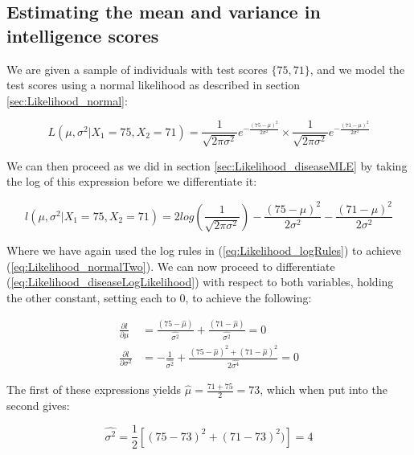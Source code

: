 \documentclass[11pt,fullpage]{book}
\begin{document}
\subsection{Estimating the mean and variance in intelligence scores}
We are given a sample of individuals with test scores $\{75,71\}$, and we model the test scores using a normal likelihood as described in section \ref{sec:Likelihood_normal}:

\begin{equation}\label{eq:Likelihood_normalTwo}
L(\mu,\sigma^2|X_1=75,X_2 =71) = \frac{1}{\sqrt{2\pi\sigma^2}}e^{-\frac{(75-\mu)^2}{2\sigma^2}}\times \frac{1}{\sqrt{2\pi\sigma^2}}e^{-\frac{(71-\mu)^2}{2\sigma^2}}
\end{equation}

We can then proceed as we did in section \ref{sec:Likelihood_diseaseMLE} by taking the log of this expression before we differentiate it:

\begin{equation}\label{eq:Likelihood_diseaseLogLikelihood}
l(\mu,\sigma^2|X_1=75,X_2 =71) = 2log\left(\frac{1}{\sqrt{2\pi\sigma^2}}\right)-{\frac{(75-\mu)^2}{2\sigma^2}}-{\frac{(71-\mu)^2}{2\sigma^2}}
\end{equation}

Where we have again used the log rules in (\ref{eq:Likelihood_logRules}) to achieve (\ref{eq:Likelihood_normalTwo}). We can now proceed to differentiate (\ref{eq:Likelihood_diseaseLogLikelihood}) with respect to both variables, holding the other constant, setting each to 0, to achieve the following:

\begin{equation}\label{eq:Likelihood_diseaseDerivativeOne}
\begin{align}
\frac{\partial l}{\partial \mu} &= {\frac{(75-\hat{\mu})}{\hat{\sigma^2}}}+{\frac{(71-\hat{\mu})}{\hat{\sigma^2}}} = 0\\
\frac{\partial l}{\partial \sigma^2} &= -\frac{1}{\hat{\sigma^2}} + \frac{(75-\hat{\mu})^2+(71-\hat{\mu})^2}{2\hat{\sigma^4}} = 0
\end{align}
\end{equation}

The first of these expressions yields $\hat{\mu} = \frac{71+75}{2} = 73$, which when put into the second gives: 

\begin{equation}
\hat{\sigma^2} = \frac{1}{2}\left[(75-73)^2 + (71-73)^2)\right] = 4
\end{equation}
\end{document}
